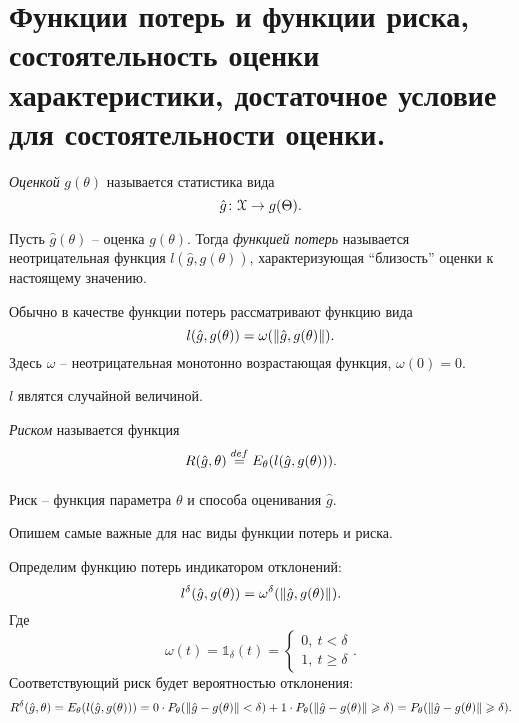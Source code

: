 \section{Функции потерь и функции риска, состоятельность оценки характеристики, 
достаточное условие для состоятельности оценки.}

\begin{definition}
    \textit{Оценкой} $g(\theta)$ называется статистика вида
    \[
        \hat{g} \colon \mathcal{X} \to g(\Theta)
    .\]
\end{definition}

\begin{definition}
    Пусть $\hat{g}(\theta)$ -- оценка $g(\theta)$. Тогда \textit{функцией
    потерь} называется неотрицательная функция $l(\hat{g}, g(\theta))$, 
    характеризующая ``близость'' оценки к настоящему значению.
\end{definition}

\begin{remark}
    Обычно в качестве функции потерь рассматривают функцию вида
    \[
        l(\hat{g}, g(\theta)) = \omega(\lVert\hat{g}, g(\theta)\rVert)
    .\]
    Здесь $\omega$ -- неотрицательная монотонно возрастающая функция,
    $\omega(0) = 0$.
\end{remark}

\begin{remark}
    $l$ являтся случайной величиной.
\end{remark}

\begin{definition}
    \textit{Риском} называется функция
    \[
        R(\hat{g}, \theta) \overset{def}{\underset{}{=}} E_{\theta}(l(\hat{g}, g(\theta))) 
    .\]
\end{definition}

\begin{remark}
    Риск -- функция параметра $\theta$ и способа оценивания $\hat{g}$.
\end{remark}

Опишем самые важные для нас виды функции потерь и риска.

\begin{definition}
    Определим функцию потерь индикатором отклонений:
    \[
        l^\delta(\hat{g}, g(\theta)) = \omega^\delta(\lVert\hat{g}, g(\theta)\rVert)
    .\] 
    Где
    \[
        \omega(t) = \mathbb{1}_\delta(t) = \begin{cases}
            0,~ t < \delta  \\
            1,~ t \geqslant \delta
        \end{cases}
    .\]
    Соответствующий риск будет вероятностью отклонения:
    \[
        R^\delta(\hat{g}, \theta) = E_{\theta}(l(\hat{g}, g(\theta))) =
        0 \cdot P_\theta(\lVert\hat{g} - g(\theta)\rVert < \delta) +
        1 \cdot P_\theta(\lVert\hat{g} - g(\theta)\rVert \geqslant \delta) =
        P_\theta(\lVert\hat{g} - g(\theta)\rVert \geqslant \delta)
    .\]
\end{definition}

